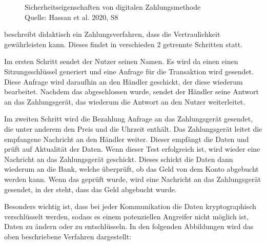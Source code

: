 \vfill
\begin{figure}[htb]
    \caption{Sicherheitseigenschaften von digitalen Zahlungsmethode \\ Quelle: Hassan et al. 2020, S8}
    \label{fig:refark_HARE}
\end{figure}
\vfill

\cite{refart:JTAS} beschreibt didaktisch ein Zahlungsverfahren, dass die Vertraulichkeit gewährleisten kann.
Dieses findet in verschieden 2 getrennte Schritten statt.

Im ersten Schritt sendet der Nutzer seinen Namen. Es wird da einen einen Sitzungsschlüssel generiert und 
eine Anfrage für die Transaktion wird gesendet. Diese Anfrage wird daraufhin an den Händler geschickt, der 
diese wiederum bearbeitet. Nachdem das abgeschlossen wurde, sendet der Händler seine Antwort an das Zahlungsgerät, 
das wiederum die Antwort an den Nutzer weiterleitet. 

Im zweiten Schritt wird die Bezahlung Anfrage an das Zahlungsgerät gesendet, die unter anderem den Preis und die 
Uhrzeit enthält. Das Zahlungsgerät leitet die empfangene Nachricht an den Händler weiter. Dieser empfängt die Daten 
und prüft auf Aktualität der Daten. Wenn dieser Test erfolgreich ist, wird wieder eine Nachricht an das Zahlungsgerät 
geschickt. Dieses schickt die Daten dann wiederum an die Bank, welche überprüft, ob das Geld von dem Konto 
abgebucht werden kann. Wenn das geprüft wurde, wird eine Nachricht an das Zahlungsgerät gesendet, in der steht, 
dass das Geld abgebucht wurde. 

Besonders wichtig ist, dass bei jeder Kommunikation die Daten kryptographisch verschlüsselt werden, sodass es einem 
potenziellen Angreifer nicht möglich ist, Daten zu ändern oder zu entschlüsseln. In den folgenden Abbildungen wird
das oben beschriebene Verfahren dargestellt:

